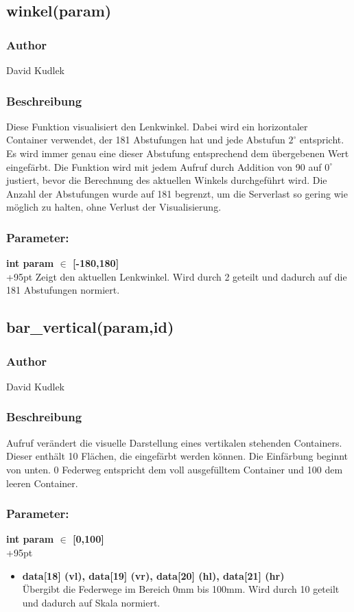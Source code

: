 \documentclass[fontsize = 12pt, paper = a4]{scrreprt}
\begin{document}
\subsection*{winkel(param)}
\subsubsection*{Author}
David Kudlek
\subsubsection*{Beschreibung}
Diese Funktion visualisiert den Lenkwinkel. Dabei wird ein horizontaler Container verwendet, der 181 Abstufungen hat und jede Abstufun $2^\circ$ entspricht. Es wird immer genau eine dieser Abstufung entsprechend dem übergebenen Wert eingefärbt. Die Funktion wird mit jedem Aufruf durch Addition von 90 auf $0^\circ$ justiert, bevor die Berechnung des aktuellen Winkels durchgeführt wird. Die Anzahl der Abstufungen wurde auf 181 begrenzt, um die Serverlast so gering wie möglich zu halten, ohne Verlust der Visualisierung. 	
\subsubsection*{Parameter:}
\textbf{int param $\in$ [-180,180]} \\
\hangindent+95pt 
Zeigt den aktuellen Lenkwinkel. Wird durch 2 geteilt und dadurch auf die 181 Abstufungen normiert.\\


\subsection*{bar\_vertical(param,id)}
\subsubsection*{Author}
David Kudlek
\subsubsection*{Beschreibung}
Aufruf verändert die visuelle Darstellung eines vertikalen stehenden Containers. Dieser enthält 10 Flächen, die eingefärbt werden können. Die Einfärbung beginnt von unten. 0 Federweg entspricht dem voll ausgefülltem Container und 100 dem leeren Container. 	
\subsubsection*{Parameter:}
\textbf{int param $\in$ [0,100]}\\
\hangindent+95pt 
\begin{itemize}
\item \textbf{data[18] (vl), data[19] (vr), data[20] (hl), data[21] (hr)}\\
Übergibt die Federwege im Bereich 0mm bis 100mm. Wird durch 10 geteilt und dadurch auf Skala normiert. \\
\end{itemize}
\end{document}
